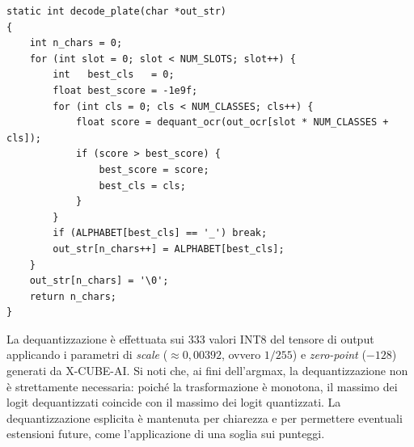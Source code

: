 \begin{lstlisting}[style=stileC, caption={Decodifica della stringa di targa dai logit dell'OCR. Per ogni slot, si seleziona la classe con punteggio massimo; la decodifica si arresta al primo carattere di padding.}, label={lst:decode}]
static int decode_plate(char *out_str)
{
    int n_chars = 0;
    for (int slot = 0; slot < NUM_SLOTS; slot++) {
        int   best_cls   = 0;
        float best_score = -1e9f;
        for (int cls = 0; cls < NUM_CLASSES; cls++) {
            float score = dequant_ocr(out_ocr[slot * NUM_CLASSES + cls]);
            if (score > best_score) {
                best_score = score;
                best_cls = cls;
            }
        }
        if (ALPHABET[best_cls] == '_') break;
        out_str[n_chars++] = ALPHABET[best_cls];
    }
    out_str[n_chars] = '\0';
    return n_chars;
}
\end{lstlisting}

La dequantizzazione è effettuata sui 333 valori INT8 del tensore di output applicando i parametri di \textit{scale} ($\approx 0{,}00392$, ovvero $1/255$) e \textit{zero-point} ($-128$) generati da X-CUBE-AI. Si noti che, ai fini dell'argmax, la dequantizzazione non è strettamente necessaria: poiché la trasformazione è monotona, il massimo dei logit dequantizzati coincide con il massimo dei logit quantizzati. La dequantizzazione esplicita è mantenuta per chiarezza e per permettere eventuali estensioni future, come l'applicazione di una soglia sui punteggi.
